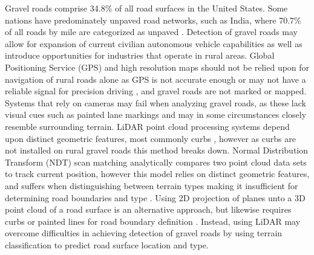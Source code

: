 \documentclass[journal,onecolumn]{IEEEtran}
\begin{document}
	{Gravel roads comprise 34.8\% \cite{road_stats_2} of all road surfaces in the United States. Some nations have predominately unpaved road networks, such as India, where 70.7\% of all roads by mile are categorized as unpaved \cite{malik_lal_2019}. Detection of gravel roads may allow for expansion of current civilian autonomous vehicle capabilities as well as introduce opportunities for industries that operate in rural areas. Global Positioning Service (GPS) and high resolution maps should not be relied upon for navigation of rural roads alone as GPS is not accurate enough or may not have a reliable signal for precision driving \cite{noauthor_gpsgov_nodate}, and gravel roads are not marked or mapped. Systems that rely on cameras may fail when analyzing gravel roads, as these lack visual cues such as painted lane markings \cite{crisman_scarf_1993} and may in some circumstances closely resemble surrounding terrain. LiDAR point cloud processing systems depend upon distinct geometric features, most commonly curbs \cite{yadav_extraction_2017,liu_new_2013,qiu_fast_2016,fernandes_road_2014,seker_experiments_nodate,yang_semi-automated_2013,miyazaki_line-based_2014,hervieu_road_2013,smadja_road_nodate}, however as curbs are not installed on rural gravel roads \cite{skorseth_gravel_nodate} this method breaks down. Normal Distribution Transform (NDT) scan matching analytically compares two point cloud data sets to track current position, however this model relies on distinct geometric features, and suffers when distinguishing between terrain types making it insufficient for determining road boundaries and type \cite{biber_normal_2003}. Using 2D projection of planes unto a 3D point cloud of a road surface is an alternative approach, but likewise requires curbs or painted lines for road boundary definition \cite{fernandes_road_2014, borkar_robust_2009-1, guo_lane_2015}. Instead, using LiDAR may overcome difficulties in achieving detection of gravel roads by using terrain classification to predict road surface location and type.}
\end{document}
